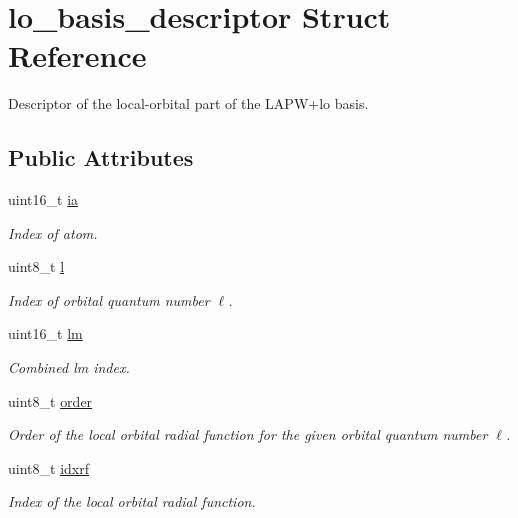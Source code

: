 \hypertarget{structlo__basis__descriptor}{}\section{lo\+\_\+basis\+\_\+descriptor Struct Reference}
\label{structlo__basis__descriptor}


Descriptor of the local-\/orbital part of the L\+A\+P\+W+lo basis.  


\subsection*{Public Attributes}
\begin{DoxyCompactItemize}
\item 
uint16\+\_\+t \hyperlink{structlo__basis__descriptor_adadd7e7ba8c43cc00d1a23d314b322c2}{ia}
\begin{DoxyCompactList}\small\item\em Index of atom. \end{DoxyCompactList}\item 
uint8\+\_\+t \hyperlink{structlo__basis__descriptor_a8e71167cce641d248983f6632958295c}{l}
\begin{DoxyCompactList}\small\item\em Index of orbital quantum number $ \ell $. \end{DoxyCompactList}\item 
uint16\+\_\+t \hyperlink{structlo__basis__descriptor_ae2fb8ed488b4b69f0785c05d2c798c4e}{lm}
\begin{DoxyCompactList}\small\item\em Combined lm index. \end{DoxyCompactList}\item 
uint8\+\_\+t \hyperlink{structlo__basis__descriptor_a9f026acaa1e897a60c2c8d3956aae6ca}{order}
\begin{DoxyCompactList}\small\item\em Order of the local orbital radial function for the given orbital quantum number $ \ell $. \end{DoxyCompactList}\item 
uint8\+\_\+t \hyperlink{structlo__basis__descriptor_aef20fdb76c57632a87ee216a121af342}{idxrf}
\begin{DoxyCompactList}\small\item\em Index of the local orbital radial function. \end{DoxyCompactList}\end{DoxyCompactItemize}


